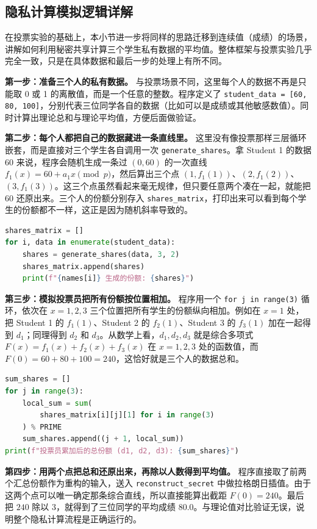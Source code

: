 \documentclass[a4paper]{article}
\begin{document}
\subsection{隐私计算模拟逻辑详解}
在投票实验的基础上，本小节进一步将同样的思路迁移到连续值（成绩）的场景，讲解如何利用秘密共享计算三个学生私有数据的平均值。整体框架与投票实验几乎完全一致，只是在具体数据和最后一步的处理上有所不同。

\textbf{第一步：准备三个人的私有数据。} 与投票场景不同，这里每个人的数据不再是只能取 0 或 1 的离散值，而是一个任意的整数。程序定义了 \texttt{student\_data = [60, 80, 100]}，分别代表三位同学各自的数据（比如可以是成绩或其他敏感数值）。同时计算出理论总和与理论平均值，方便后面做验证。

\textbf{第二步：每个人都把自己的数据藏进一条直线里。} 这里没有像投票那样三层循环嵌套，而是直接对三个学生各自调用一次 \texttt{generate\_shares}。拿 Student 1 的数据 $60$ 来说，程序会随机生成一条过 $(0,60)$ 的一次直线 $f_1(x)=60+a_1x \pmod p$，然后算出三个点 $(1,f_1(1))$、$(2,f_1(2))$、$(3,f_1(3))$。这三个点虽然看起来毫无规律，但只要任意两个凑在一起，就能把 $60$ 还原出来。三个人的份额分别存入 \texttt{shares\_matrix}，打印出来可以看到每个学生的份额都不一样，这正是因为随机斜率导致的。

\begin{lstlisting}[language=Python,caption={份额生成代码片段}]
shares_matrix = []
for i, data in enumerate(student_data):
    shares = generate_shares(data, 3, 2)
    shares_matrix.append(shares)
    print(f"{names[i]} 生成的份额: {shares}")
\end{lstlisting}

\textbf{第三步：模拟投票员把所有份额按位置相加。} 程序用一个 \texttt{for j in range(3)} 循环，依次在 $x=1,2,3$ 三个位置把所有学生的份额纵向相加。例如在 $x=1$ 处，把 Student 1 的 $f_1(1)$、Student 2 的 $f_2(1)$、Student 3 的 $f_3(1)$ 加在一起得到 $d_1$；同理得到 $d_2$ 和 $d_3$。从数学上看，$d_1,d_2,d_3$ 就是综合多项式 $F(x)=f_1(x)+f_2(x)+f_3(x)$ 在 $x=1,2,3$ 处的函数值，而 $F(0)=60+80+100=240$，这恰好就是三个人的数据总和。

\begin{lstlisting}[language=Python,caption={份额按位置汇总代码片段}]
sum_shares = []
for j in range(3):
    local_sum = sum(
        shares_matrix[i][j][1] for i in range(3)
    ) % PRIME
    sum_shares.append((j + 1, local_sum))
print(f"投票员累加后的总份额 (d1, d2, d3): {sum_shares}")
\end{lstlisting}

\textbf{第四步：用两个点把总和还原出来，再除以人数得到平均值。} 程序直接取了前两个汇总份额作为重构的输入，送入 \texttt{reconstruct\_secret} 中做拉格朗日插值。由于这两个点可以唯一确定那条综合直线，所以直接能算出截距 $F(0)=240$。最后把 $240$ 除以 $3$，就得到了三位同学的平均成绩 $80.0$。与理论值对比验证无误，说明整个隐私计算流程是正确运行的。
\end{document}
